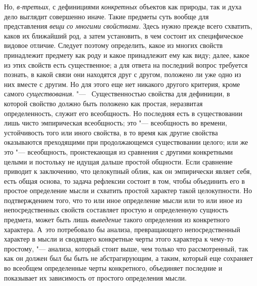 Но, {\em в-третьих},
с дефинициями
{\em конкретных} объектов
как природы, так и духа дело выглядит совершенно иначе. Такие предметы суть
вообще для представления {\em вещи}
{\em со многими свойствами}.
Здесь нужно прежде всего схватить, каков их ближайший род, а
затем установить, в чем состоит их специфическое видовое отличие. Следует
поэтому определить, какое из многих свойств принадлежит предмету как роду и
какое принадлежит ему как виду; далее, какое из этих свойств есть
существенное; а для ответа на последний вопрос требуется познать, в какой
связи они находятся друг с другом, положено ли уже одно из них вместе с
другим. Но для этого еще нет никакого другого критерия, кроме самого
{\em существования}. "---
~Существенностью свойства для дефиниции, в которой свойство
должно быть положено как простая, неразвитая определенность, служит его
всеобщность. Но последняя есть в существовании лишь чисто эмпирическая
всеобщность; это "--- всеобщность во времени, устойчивость того
или иного свойства, в то время как другие свойства оказываются преходящими
при продолжающемся существовании целого; или же это
"--- всеобщность, проистекающая из сравнения с другими
конкретными целыми и постольку не идущая дальше простой общности. Если
сравнение приводит к заключению, что целокупный облик, как
он эмпирически являет себя, есть общая основа, то задача рефлексии состоит
в том, чтобы объединить его в простое определение мысли и схватить простой
характер такой целокупности. Но подтверждением того, что то или иное
определение мысли или то или иное из непосредственных свойств составляет
простую и определенную сущность предмета, может быть лишь
{\em выведение} такого
определения из конкретного характера. А~это потребовало бы анализа,
превращающего непосредственный характер в мысли и сводящего конкретные
черты этого характера к чему-то простому, "--- анализа, который
стоит выше, чем только что рассмотренный, так как он должен был бы быть не
абстрагирующим, а таким, который еще сохраняет во всеобщем определенные
черты конкретного, объединяет последние и показывает их зависимость от
простого определения мысли.

